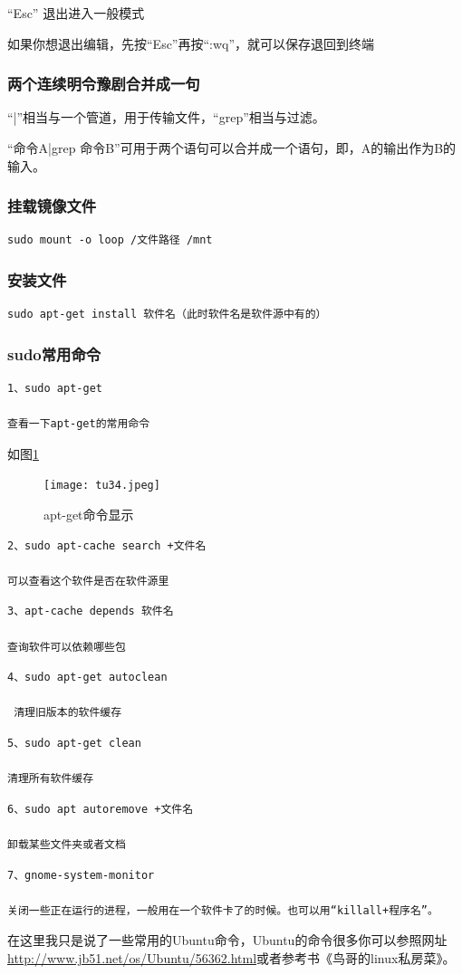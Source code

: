 \documentclass{article}
\begin{document}
“Esc” 退出进入一般模式

如果你想退出编辑，先按“Esc”再按“:wq”，就可以保存退回到终端
\subsubsection{两个连续明令豫剧合并成一句}
“|”相当与一个管道，用于传输文件，“grep”相当与过滤。

“命令A|grep 命令B”可用于两个语句可以合并成一个语句，即，A的输出作为B的输入。

\subsubsection{挂载镜像文件}
\begin{lstlisting}
sudo mount -o loop /文件路径 /mnt
\end{lstlisting}
\subsubsection{安装文件}
\begin{lstlisting}
sudo apt-get install 软件名（此时软件名是软件源中有的）
\end{lstlisting}
\subsubsection{sudo常用命令}
\begin{lstlisting}
1、sudo apt-get

查看一下apt-get的常用命令
\end{lstlisting}
如图\ref{tu34}
\begin{figure}[!htb] %
\centering
\texttt{[image: tu34.jpeg]}
\caption{\small apt-get命令显示}
\label{tu34}
\end{figure} 
\begin{lstlisting}
2、sudo apt-cache search +文件名

可以查看这个软件是否在软件源里
\end{lstlisting}
\begin{lstlisting}
3、apt-cache depends 软件名

查询软件可以依赖哪些包
\end{lstlisting}
\begin{lstlisting}
4、sudo apt-get autoclean

 清理旧版本的软件缓存
\end{lstlisting}
\begin{lstlisting}
5、sudo apt-get clean

清理所有软件缓存
\end{lstlisting}
\begin{lstlisting}
6、sudo apt autoremove +文件名

卸载某些文件夹或者文档
\end{lstlisting}
\begin{lstlisting}
7、gnome-system-monitor

关闭一些正在运行的进程，一般用在一个软件卡了的时候。也可以用“killall+程序名”。
\end{lstlisting}
在这里我只是说了一些常用的Ubuntu命令，Ubuntu的命令很多你可以参照网址\url{http://www.jb51.net/os/Ubuntu/56362.html}或者参考书{\color{red}《鸟哥的linux私房菜》}。
\end{document}
